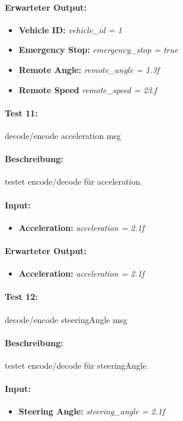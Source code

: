 \documentclass[a4paper, 12pt, titlepage]{scrartcl}
\begin{document}
{			\paragraph{Erwarteter Output:}
			\begin{itemize} \itemsep-0.5em
				\item \textbf{Vehicle ID:} \emph{vehicle\_id = 1}
				\item \textbf{Emergency Stop:} \emph{emergency\_stop = true}
				\item \textbf{Remote Angle:} \emph{remote\_angle = 1.3f}
				\item \textbf{Remote Speed} \emph{remote\_speed = 23.f}
			\end{itemize}
			
			\paragraph{Test 11:}{decode/encode acceleration msg}
			\paragraph{Beschreibung:} testet encode/decode für acceleration.
			\paragraph{Input:}
			\begin{itemize} \itemsep-0.5em
				\item \textbf{Acceleration:} \emph{acceleration = 2.1f}
			\end{itemize}
			\paragraph{Erwarteter Output:}
			\begin{itemize} \itemsep-0.5em
				\item \textbf{Acceleration:} \emph{acceleration = 2.1f}
			\end{itemize}
			
			\paragraph{Test 12:}{decode/encode steeringAngle msg}
			\paragraph{Beschreibung:} testet encode/decode für steeringAngle.
			\paragraph{Input:}
			\begin{itemize} \itemsep-0.5em
				\item \textbf{Steering Angle:} \emph{steering\_angle = 2.1f}
			\end{itemize}
}
\end{document}
